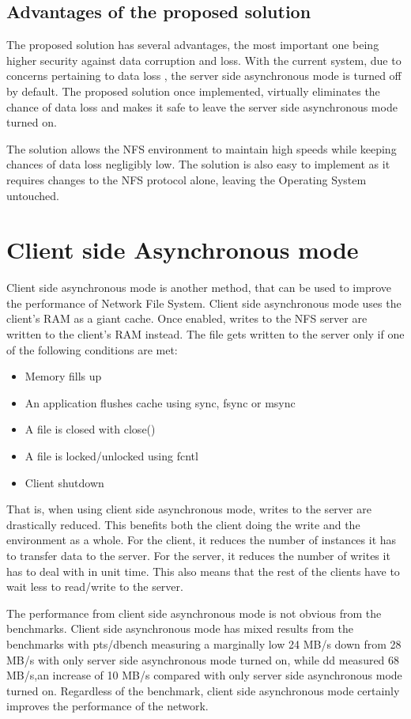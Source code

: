 \documentclass[conference]{IEEEtran}
\begin{document}
\subsection{Advantages of the proposed solution}
The proposed solution has several advantages, the most important one
being higher security against data corruption and loss. With the current 
system, due to concerns pertaining to data loss , the server side asynchronous 
mode is turned off by default. The proposed solution once implemented, virtually
eliminates the chance of data loss and makes it safe to leave the server
side asynchronous mode turned on.

The solution allows the NFS environment to maintain high speeds while
keeping chances of data loss negligibly low. The solution is also easy to
implement as it requires changes to the NFS protocol alone, leaving the
Operating System untouched.

\section{Client side Asynchronous mode}
Client side asynchronous mode is another method, that can be used to improve
the performance of Network File System. Client side asynchronous mode uses
the client's RAM as a giant cache. Once enabled, writes to the NFS server
are written to the client's RAM instead. The file gets written to the server 
only if one of the following conditions are met:
\begin{itemize}
\item Memory fills up
\item An application flushes cache using sync, fsync or msync
\item A file is closed with close()
\item A file is locked/unlocked using fcntl
\item Client shutdown
\end{itemize}

That is, when using client side asynchronous mode, writes to the server are
drastically reduced. This benefits both the client doing the write and the
environment as a whole. For the client, it reduces the number of instances
it has to transfer data to the server. For the server, it reduces the
number of writes it has to deal with in unit time. This also means that the
rest of the clients have to wait less to read/write to the server.

The performance from client side asynchronous mode is not obvious from the
benchmarks. Client side asynchronous mode has mixed results from the 
benchmarks with pts/dbench measuring a marginally low 24 MB/s down from 
28 MB/s with only server side asynchronous mode turned on, while dd 
measured 68 MB/s,an increase of 10 MB/s compared with only server side
asynchronous mode turned on. Regardless of the benchmark, client side 
asynchronous mode certainly improves the performance of the network.
\end{document}
